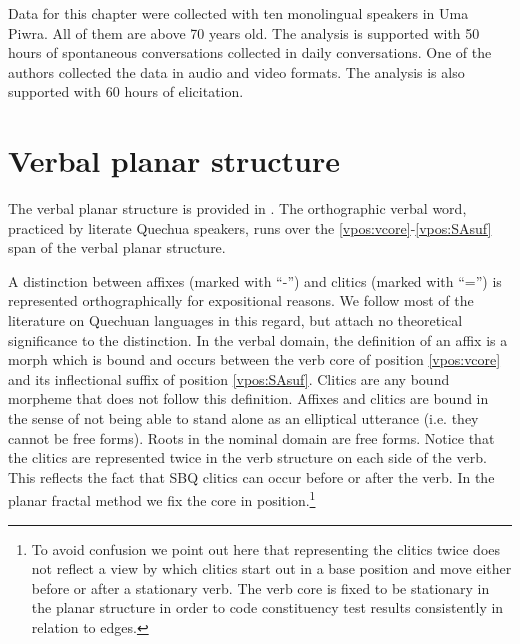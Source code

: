 \documentclass[output=paper]{langscibook}
\begin{document}
Data for this chapter were collected with ten monolingual speakers in Uma Piwra. All of them are above 70 years old. The analysis is supported with 50 hours of spontaneous conversations collected in daily conversations. One of the authors collected the data in audio and video formats. The analysis is also supported with 60 hours of elicitation. 

\largerpage[-2]
\section{Verbal planar structure} %
\label{sbq:sec:planarstructures}

The verbal planar structure is provided in . The orthographic verbal word, practiced by literate Quechua speakers, runs over the \ref{vpos:vcore}-\ref{vpos:SAsuf} span of the verbal planar structure.

A distinction between affixes (marked with ``-'') and clitics (marked with ``='') is represented orthographically for expositional reasons. We follow most of the literature on Quechuan languages in this regard, but attach no theoretical significance to the distinction. In the verbal domain, the definition of an affix is a morph which is bound and occurs between the verb core of position \ref{vpos:vcore} and its inflectional suffix of position \ref{vpos:SAsuf}. Clitics are any bound morpheme that does not follow this definition. Affixes and clitics are bound in the sense of not being able to stand alone as an elliptical utterance (i.e. they cannot be free forms). Roots in the nominal domain are free forms. Notice that the clitics are represented twice in the verb structure on each side of the verb. This reflects the fact that SBQ clitics can occur before or after the verb. In the planar fractal method we fix the core in position.\footnote{To avoid confusion we point out here that representing the clitics twice does not reflect a view by which clitics start out in a base position and move either before or after a stationary verb. The verb core is fixed to be stationary in the planar structure in order to code constituency test results consistently in relation to edges.}

\largerpage[-2]
\end{document}
